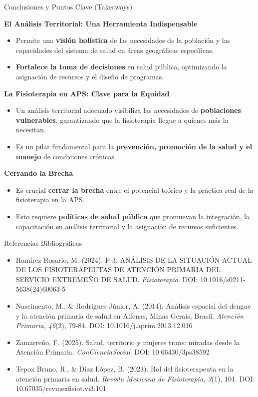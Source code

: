 \documentclass[aspectratio=169]{beamer}
\begin{document}
\begin{frame}{Conclusiones y Puntos Clave (Takeaways)}


\textbf{El Análisis Territorial: Una Herramienta Indispensable}
\begin{itemize}
  \item Permite una \textbf{visión holística} de las necesidades de la población y las capacidades del sistema de salud en áreas geográficas específicas.
  \item \textbf{Fortalece la toma de decisiones} en salud pública, optimizando la asignación de recursos y el diseño de programas.
\end{itemize}
\textbf{La Fisioterapia en APS: Clave para la Equidad}
\begin{itemize}
  \item Un análisis territorial adecuado visibiliza las necesidades de \textbf{poblaciones vulnerables}, garantizando que la fisioterapia llegue a quienes más la necesitan.
  \item Es un pilar fundamental para la \textbf{prevención, promoción de la salud y el manejo} de condiciones crónicas.
\end{itemize}
\textbf{Cerrando la Brecha}
\begin{itemize}
  \item Es crucial \textbf{cerrar la brecha} entre el potencial teórico y la práctica real de la fisioterapia en la APS.
  \item Esto requiere \textbf{políticas de salud pública} que promuevan la integración, la capacitación en análisis territorial y la asignación de recursos suficientes.
\end{itemize}
\end{frame}

\begin{frame}{Referencias Bibliográficas}


\begin{itemize}
  \item Ramírez Rosario, M. (2024). P-3. ANÁLISIS DE LA SITUACIÓN ACTUAL DE LOS FISIOTERAPEUTAS DE ATENCIÓN PRIMARIA DEL SERVICIO EXTREMEÑO DE SALUD. \textit{Fisioterapia}. DOI: 10.1016/s0211-5638(24)60063-5
  \item Nascimento, M., \& Rodrigues-Júnior, A. (2014). Análisis espacial del dengue y la atención primaria de salud en Alfenas, Minas Gerais, Brasil. \textit{Atención Primaria, 46}(2), 79-84. DOI: 10.1016/j.aprim.2013.12.016
  \item Zamarreño, F. (2025). Salud, territorio y mujeres trans: miradas desde la Atención Primaria. \textit{ConCienciaSocial}. DOI: 10.66430/3ps38592
  \item Tepox Bruno, R., \& Díaz López, B. (2023). Rol del fisioterapeuta en la atención primaria en salud. \textit{Revista Mexicana de Fisioterapia, 3}(1), 101. DOI: 10.67035/revmexfisiot.vi3.101
\end{itemize}
\end{frame}
\end{document}
